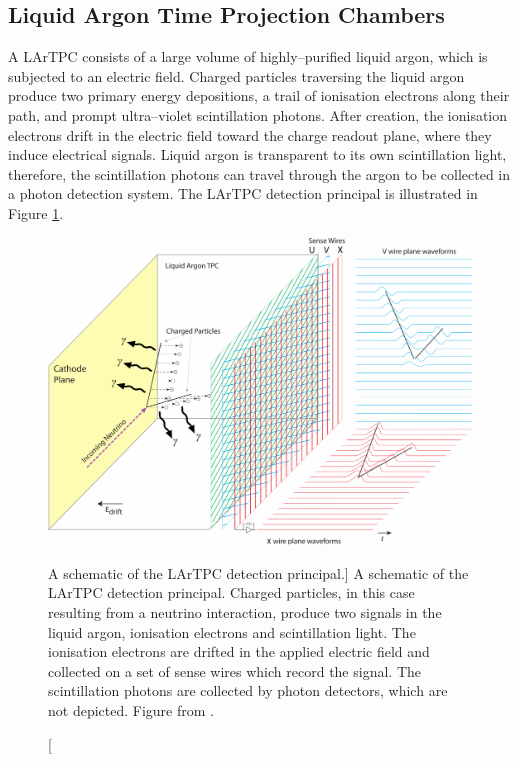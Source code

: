 \subsection{Liquid Argon Time Projection Chambers}
A LArTPC consists of a large volume of highly--purified liquid argon, which is
subjected to an electric field. Charged particles traversing the liquid argon 
produce two primary energy depositions, a trail of ionisation electrons along 
their path, and prompt ultra--violet scintillation photons. After creation, 
the ionisation electrons drift in the electric field toward the charge readout 
plane, where they induce electrical signals. Liquid argon is transparent to 
its own scintillation light, therefore, the scintillation photons can travel 
through the argon to be collected in a photon detection system. The LArTPC 
detection principal is illustrated in Figure \ref{fig:lartpc}. 

\begin{figure}

	\centering

	\includegraphics[width=\textwidth]{figures/LArTPC_Concept.pdf}

	\caption
	[A schematic of the LArTPC detection principal.]
	{A schematic of the LArTPC detection principal. Charged particles, in this
	case resulting from a neutrino interaction, produce two signals in the liquid
	argon, ionisation electrons and scintillation light. The ionisation electrons
	are drifted in the applied electric field and collected on a set of sense
	wires which record the signal. The scintillation photons are collected by 
	photon detectors, which are not depicted. Figure from \cite{Abi:2020loh}.}

	\label{fig:lartpc}

\end{figure}

